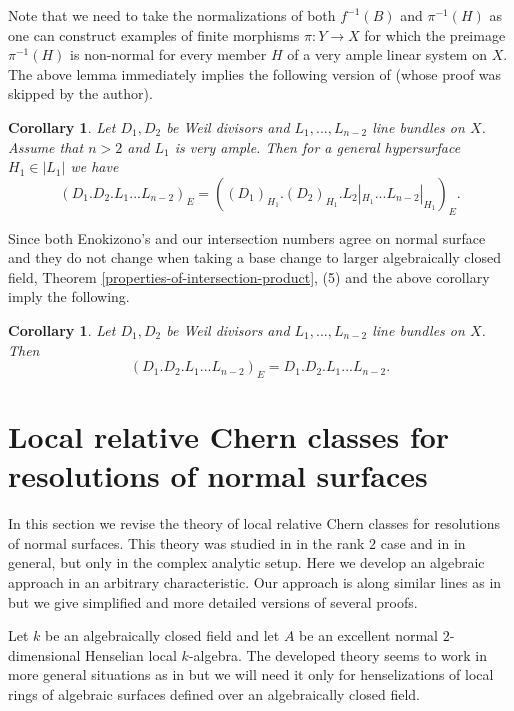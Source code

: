\documentclass[twoside, 11pt]{article}
\theoremstyle{plain}
\newtheorem{Corollary}[Thm]{\sc Corollary}
\theoremstyle{definition}
\theoremstyle{remark}
\begin{document}
Note that we need to take the normalizations of both $f^{-1}(B)$ and $\pi^{-1}(H)$ as
one can construct examples of finite morphisms $\pi: Y\to X$ for which the preimage $\pi^{-1}(H)$ is non-normal for every member $H$ of a very ample linear system on $X$. 
The above lemma immediately implies the following version of \cite[Theorem A.1, (iv)]{En} (whose proof was skipped by the author).

\begin{Corollary}
Let $D_1, D_2$ be Weil divisors and $L_1,..., L_{n-2}$ line bundles on $X$. Assume that $n>2$ and $L_1$ is very ample. Then for a general hypersurface  $H_1\in |L_1|$ we have 
$$(D_1.D_2.L_1...L_{n-2})_E =((D_1)_{H_1}.(D_2)_{H_1}.L_2|_{H_1}...L_{n-2}|_{H_1})_E.$$
\end{Corollary}

Since both Enokizono's and our intersection numbers agree on normal surface and they do not change when taking a base change to larger algebraically closed field,
Theorem \ref{properties-of-intersection-product}, (5) and the above corollary imply the following.

\begin{Corollary}
Let $D_1, D_2$ be Weil divisors and $L_1,..., L_{n-2}$ line bundles on $X$. Then 
$$(D_1.D_2.L_1...L_{n-2})_E=D_1.D_2.L_1...L_{n-2}.$$
\end{Corollary}


 

\section{Local relative Chern classes for resolutions of normal surfaces}

In this section we revise the theory of local relative Chern classes  for resolutions of normal surfaces.
This theory was studied in \cite{Wa} in the rank $2$ case and in  \cite{La0} in general, but only in the complex analytic setup. Here we develop an algebraic approach in an arbitrary characteristic.  Our approach is along similar lines 
as in \cite{La0} but we give simplified and more detailed versions of several proofs. 

\medskip

Let $k$ be an algebraically closed field and let $A$ be an excellent normal $2$-dimensional Henselian local $k$-algebra. The developed theory seems to work in more general situations as in \cite{Li} but we will need it only for henselizations of local rings of algebraic surfaces defined over an algebraically closed field. 
\end{document}
